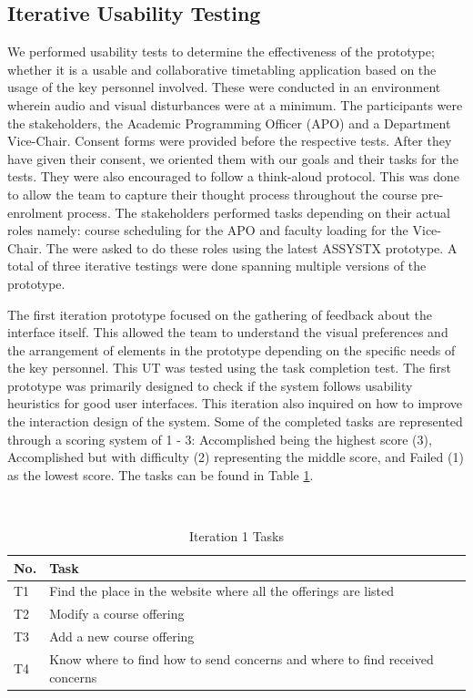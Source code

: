 \subsection{Iterative Usability Testing}
We performed usability tests to determine the effectiveness of the prototype; whether it is a usable and collaborative timetabling application based on the usage of the key personnel involved. These were conducted in an environment wherein audio and visual disturbances were at a minimum. The participants were the stakeholders, the Academic Programming Officer (APO) and a Department Vice-Chair. Consent forms were provided before the respective tests. After they have given their consent, we oriented them with our goals and their tasks for the tests. They were also encouraged to follow a think-aloud protocol. This was done to allow the team to capture their thought process throughout the course pre-enrolment process. The stakeholders performed tasks depending on their actual roles namely:  course scheduling for the APO and faculty loading for the Vice-Chair. The were asked to do these roles using the latest ASSYSTX prototype. A total of three iterative testings were done spanning multiple versions of the prototype. 

The first iteration prototype focused on the gathering of feedback about the interface itself. This allowed the team to understand the visual preferences and the arrangement of elements in the prototype depending on the specific needs of the key personnel. This UT was tested using the task completion test. The first prototype was primarily designed to check if the system follows usability heuristics for good user interfaces. This iteration also inquired on how to improve the interaction design of the system. Some of the completed tasks are represented through a scoring system of 1 - 3: Accomplished being the highest score (3), Accomplished but with diﬃculty (2) representing the middle score, and Failed (1) as the lowest score. The tasks can be found in Table \ref{tab:tasks1}.

\begin{table}
  \centering
  \caption{Iteration 1 Tasks}~\label{tab:tasks1}
  \addtolength{\tabcolsep}{2pt} 
  \begin{tabular}{p{0.5cm}|p{6.5cm}}
  	\toprule
    \rule{0pt}{8pt}No. & Task \\[2pt]
    \toprule
    T1 & Find the place in the website where all the offerings are listed \\
    T2 & Modify a course offering \\
    T3 & Add a new course offering \\
    T4 & Know where to find how to send concerns and where to find received concerns \\
    \bottomrule
  \end{tabular}
  \addtolength{\tabcolsep}{-2pt} 
\end{table}

